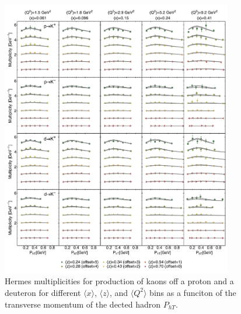 \documentclass[aps,preprintnumbers,showpacs,nofootinbib,superscriptaddress,floatfix]{revtex4}
\begin{document}
\begin{figure}[h!]
\begin{center}
\includegraphics[width=0.90\textwidth]{plots/Hermes_Kaons_SCIplot_flINDEP.pdf}
\end{center}
\caption{Hermes multiplicities for production of kaons off a proton and a deuteron for different $\langle x \rangle$, $\langle z \rangle$, and $\langle Q^2 \rangle$ bins as a funciton of the transverse momentum of the dected hadron $P_{hT}$.} 
\label{f:H_kaons}
\end{figure}
\end{document}
